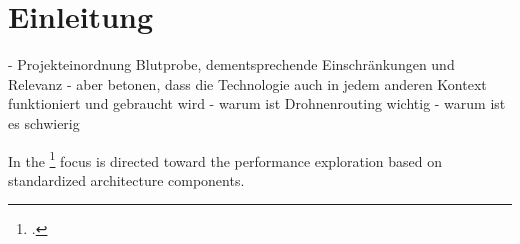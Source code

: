 \section*{Einleitung}
- Projekteinordnung Blutprobe, dementsprechende Einschränkungen und Relevanz
- aber betonen, dass die Technologie auch in jedem anderen Kontext funktioniert und gebraucht wird
- warum ist Drohnenrouting wichtig
- warum ist es schwierig

In \cite{Gustafsson2016} the \footcite{Gustafsson2016}  focus \cite{Gustafsson2016} is directed toward
    the performance exploration based on standardized architecture
    components.




